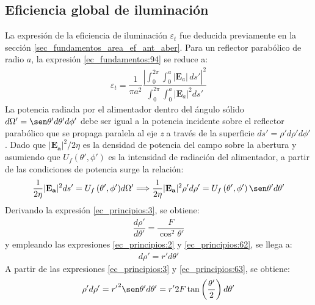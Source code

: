 \subsection{Eficiencia global de iluminación}
\label{subsec_principios_efi_glo_ilu}

La expresión de la eficiencia de iluminación $\varepsilon_t$ fue deducida previamente en la sección \ref{sec_fundamentos_area_ef_ant_aber}. Para un reflector parabólico de radio $a$, la expresión \eqref{ec_fundamentos:94} se reduce a:
\begin{align}
\varepsilon_t  = \dfrac{1}{\pi a^2}\dfrac{\left|\displaystyle\int_0^{2\pi}\!\!\!\int_0^a\lvert\mathbf{E}_a\rvert\, ds'\right|^2}{\displaystyle\int_0^{2\pi}\!\!\!\int_0^a\lvert\mathbf{E}_a\rvert^2 ds'}
\label{ec_principios:60}
\end{align}
La potencia radiada por el alimentador dentro del ángulo sólido $d\Omega ' = \sen\theta 'd\theta 'd\phi '$ debe ser igual a la potencia incidente sobre el reflector parabólico que se propaga paralela al eje \emph{z} a través de la superficie $ds' = \rho 'd\rho 'd\phi '$ \cite{Orfanidis}. Dado que $ \lvert\mathbf{E_a}\rvert ^2/2\eta$ es la densidad de potencia del campo sobre la abertura y asumiendo que $U_f\left(\theta ',\phi '\right)$ es la intensidad de radiación del alimentador, a partir de las condiciones de potencia surge la relación:
\begin{align}
\dfrac{1}{2\eta}\lvert\mathbf{E_a}\rvert ^2ds' = U_f\left(\theta ',\phi '\right)\!d\Omega '\Longrightarrow \dfrac{1}{2\eta}\lvert\mathbf{E_a}\rvert ^2\rho 'd\rho ' = U_f\left(\theta ',\phi '\right)\sen\theta 'd\theta '
\label{ec_principios:61}
\end{align}
Derivando la expresión \eqref{ec_principios:3}, se obtiene:
\begin{align}
\dfrac{d\rho '}{d\theta '} = \dfrac{F}{\cos^2\theta '}
\label{ec_principios:62}
\end{align}
y empleando las expresiones \eqref{ec_principios:2} y \eqref{ec_principios:62}, se llega a:
\begin{align}
d\rho ' = r'd\theta '
\label{ec_principios:63}
\end{align}
A partir de las expresiones \eqref{ec_principios:3} y \eqref{ec_principios:63}, se obtiene:
\begin{align}
\rho 'd\rho ' = {r'}^2\sen\theta 'd\theta ' = r'2F\tan\left(\frac{\theta '}{2}\right)d\theta '
\label{ec_principios:64}
\end{align}
